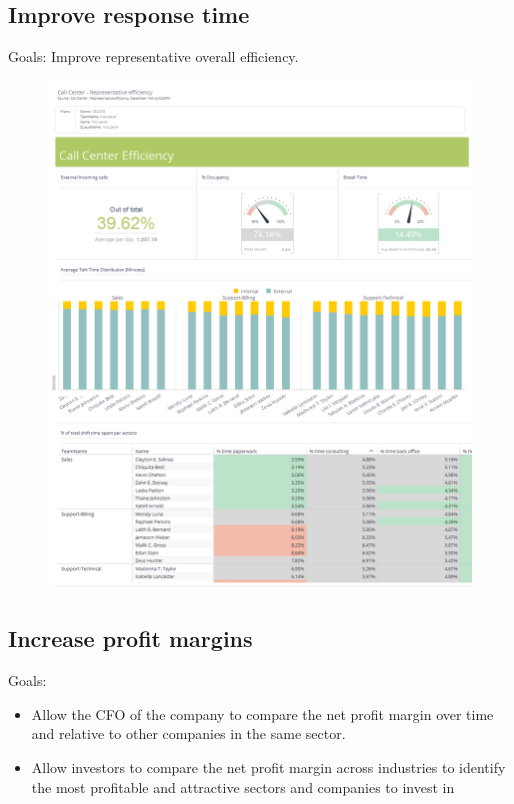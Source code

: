 \documentclass[]{book}
\providecommand{\tightlist}{%
  \setlength{\itemsep}{0pt}\setlength{\parskip}{0pt}}
\begin{document}
\subsection{Improve response time}\label{improve-response-time}

Goals: Improve representative overall efficiency.

\begin{figure}
\centering
\includegraphics{call.png}
\caption{}
\end{figure}

\subsection{Increase profit margins}\label{increase-profit-margins}

Goals:

\begin{itemize}
\tightlist
\item
  Allow the CFO of the company to compare the net profit margin over
  time and relative to other companies in the same sector.
\item
  Allow investors to compare the net profit margin across industries to
  identify the most profitable and attractive sectors and companies to
  invest in
\end{itemize}
\end{document}
